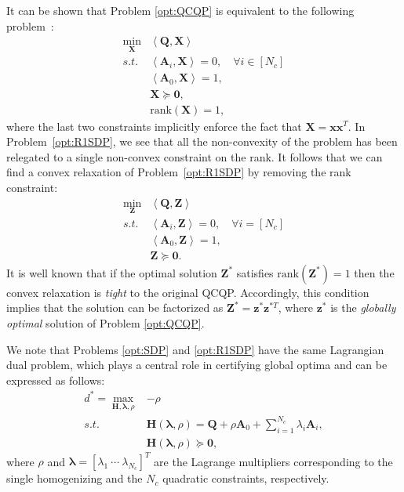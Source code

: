 \documentclass[lettersize,journal]{IEEEtran}
\newcommand{\inner}[2]{\left<#1,#2\right>}
\newcommand{\rank}[1]{\mbox{rank}\left(#1\right)}
\newcommand{\indset}[1]{\left[#1\right]}
\begin{document}
It can be shown that Problem \eqref{opt:QCQP} is equivalent to the following problem~\cite{cifuentesLocalStabilitySemidefinite2022}:
\begin{equation}\label{opt:R1SDP}
	\begin{array}{rl}
		\min\limits_{\bm{X}} & \inner{\bm{Q}}{\bm{X}}\\
		s.t.&\inner{\bm{A}_{i}}{\bm{X}}= 0, \quad \forall i \in \indset{N_c}\\
		& \inner{\bm{A}_0}{\bm{X}} = 1,\\
		& \bm{X} \succeq \bm{0},\\
		& \mbox{rank}(\bm{X})=1,
	\end{array}
\end{equation}
where the last two constraints implicitly enforce the fact that $\bm{X} = \bm{x}\bm{x}^T$. In Problem~\eqref{opt:R1SDP}, we see that all the non-convexity of the problem has been relegated to a single non-convex constraint on the rank. It follows that we can find a convex relaxation of Problem~\eqref{opt:R1SDP} by removing the rank constraint: 
\begin{equation}\label{opt:SDP}
	\begin{array}{rl}
		\min\limits_{\bm{Z}} & \inner{\bm{Q}}{\bm{Z}}\\
		s.t.&\inner{\bm{A}_i}{\bm{Z}}= 0, \quad \forall i = \left[N_c\right]\\
		& \inner{\bm{A}_0}{\bm{Z}}= 1, \\
		& \bm{Z} \succeq \bm{0}.
	\end{array}
\end{equation}
It is well known that if the optimal solution $ \bm{Z}^* $ satisfies $ \rank{\bm{Z}^*}=1 $ then the convex relaxation is \textit{tight} to the original QCQP. Accordingly, this condition implies that the solution can be factorized as $ \bm{Z}^* = \bm{z}^* \bm{z}^{*T} $, where $ \bm{z}^* $ is the \textit{globally optimal} solution of Problem \eqref{opt:QCQP}. 


We note that Problems \eqref{opt:SDP} and \eqref{opt:R1SDP} have the same Lagrangian dual problem, which plays a central role in certifying global optima and can be expressed as follows:
\begin{equation}\label{opt:Dual}
	\begin{array}{rl}
		d^*=\max\limits_{\bm{H},\bm{\lambda},\rho} &-\rho \\ 
		s.t. & \bm{H}(\bm{\lambda},\rho) = \bm{Q} + \rho\bm{A}_0 +\sum\limits_{i=1}^{N_c} \lambda_i \bm{A}_i, \\
		& \bm{H}(\bm{\lambda},\rho) \succeq \bm{0},
	\end{array}
\end{equation}
where $ \rho $ and $ \bm{\lambda} = \left[\lambda_1~\cdots~\lambda_{N_c}\right]^T $ are the Lagrange multipliers corresponding to the single homogenizing and the $N_c$ quadratic constraints, respectively. 
\end{document}
